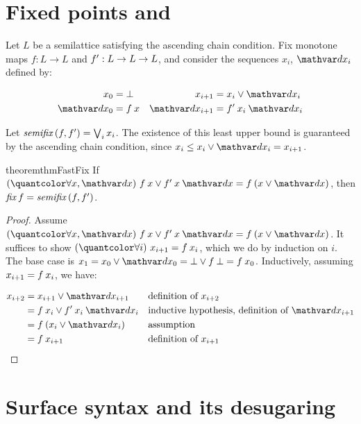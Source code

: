 
\section{Fixed points and \fastfix}

 Let $L$ be a semilattice satisfying the ascending
chain condition. Fix monotone maps $f : L \to L$ and $f' : L \to L \to L$,
and consider the sequences $x_i$, $\dx_i$ defined by:

\nopagebreak[2]
\begin{align*}
  x_0 &= \bot
  &
  x_{i+1} &= x_i \vee \dx_i\\
  \dx_0 &= f\< x
  &
  \dx_{i+1} &= \deriv f \<x_i \<\dx_i
\end{align*}

\noindent
Let $\fastfix\<(f,\deriv f) = \bigvee_i x_i$. The existence of this least upper
bound is guaranteed by the ascending chain condition, since $x_i \le x_i \vee
\dx_i = x_{i+1}$.

\begin{restatable}{theorem}{thmFastFix}\label{thm:fast-fix}
  If $\fa{x,\dx} f \<x \vee \deriv f \<x \<\dx = f \<(x \vee \dx)$,
  then \(\efix f = \fastfix\<(f,\deriv f)\).
\end{restatable}
\begin{proof}
  Assume $\fa{x,\dx} f\<x \vee \deriv f \<x \<\dx = f\<(x \vee \dx)$. It suffices
  to show $\fa{i} x_{i+1} = f \<x_i$, which we do by induction on $i$. The base
  case is $x_1 = x_0 \vee \dx_0 = \bot \vee f\<\bot = f\<x_0$. Inductively,
  assuming $x_{i+1} = f\<x_i$, we have:

  \nopagebreak[2]
  \begin{align*}
    x_{i+2} &= x_{i+1} \vee \dx_{i+1} && \text{definition of $x_{i+2}$}\\
    &= f\<x_i \vee \deriv f\<x_i\<\dx_i && \text{inductive hypothesis, definition of $\dx_{i+1}$}\\
    &= f\<(x_i \vee \dx_i) && \text{assumption}\\
    &= f\<x_{i+1} && \text{definition of $x_{i+1}$}
  \end{align*}
\end{proof}





%



\section{Surface syntax and its desugaring}

